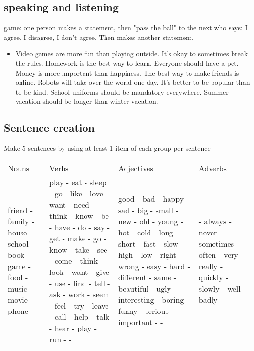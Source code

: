 \documentclass[]{article} %
\begin{document}
\subsection {speaking and listening} 
game: one person makes a statement, then "pass the ball" to the next who says: 
I agree, I disagree, I don't agree. Then makes another statement.

\begin{itemize}

\item Video games are more fun than playing outside.
It's okay to sometimes break the rules.
Homework is the best way to learn.
Everyone should have a pet.
Money is more important than happiness.
The best way to make friends is online.
Robots will take over the world one day.
It's better to be popular than to be kind.
School uniforms should be mandatory everywhere.
Summer vacation should be longer than winter vacation.
\end{itemize}

\subsection*{Sentence creation}
Make 5 sentences by using at least 1 item of each group per sentence

\begin{longtable}{| l | l | l | l |}
	\hline
	Nouns & Verbs & Adjectives & Adverbs \\

friend - 
family - 
house - 
school - 
book - 
game - 
food - 
music - 
movie - 
phone - 

	& 
play - 
eat - 
sleep - 
go - 
like - 
love - 
want - 
need - 
think - 
know - 
be - 
have - 
do - 
say - 
get - 
make - 
go - 
know - 
take - 
see - 
come - 
think - 
look - 
want - 
give - 
use - 
find - 
tell - 
ask - 
work - 
seem - 
feel - 
try - 
leave - 
call - 
help - 
talk - 
hear - 
play - 
run - 
 - 
	&  
good - 
bad - 
happy - 
sad - 
big - 
small - 
new - 
old - 
young - 
hot - 
cold - 
long - 
short - 
fast - 
slow - 
high - 
low - 
right - 
wrong - 
easy - 
hard - 
different - 
same - 
beautiful - 
ugly - 
interesting - 
boring - 
funny - 
serious - 
important - 
 - 
&   
 - 
always - 
never - 
sometimes - 
often - 
very - 
really - 
quickly - 
slowly - 
well - 
badly \\
\end{longtable}
\end{document}
